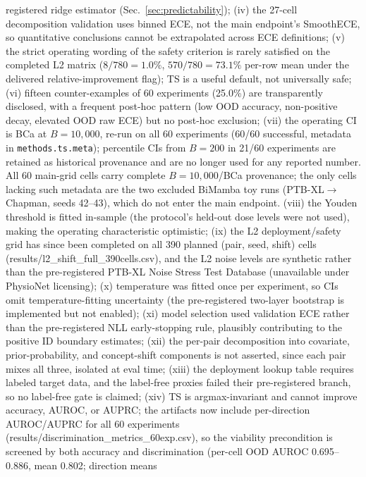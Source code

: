 \documentclass[final,5p,times,nonatbib]{elsarticle}
\begin{document}
registered ridge estimator
(Sec.~\ref{sec:predictability}); (iv) the 27-cell decomposition validation uses binned ECE,
not the main endpoint's SmoothECE, so quantitative conclusions cannot be
extrapolated across ECE definitions; (v) the strict operating wording of
the safety criterion is rarely satisfied on the completed L2 matrix
($8/780 = 1.0\%$, $570/780 = 73.1\%$ per-row mean under the delivered
relative-improvement flag); TS is a
useful default, not universally safe; (vi) fifteen counter-examples of 60
experiments (25.0\%) are transparently disclosed, with a frequent post-hoc pattern
(low OOD accuracy, non-positive decay, elevated OOD raw ECE) but no
post-hoc exclusion; (vii) the operating CI is BCa at $B=10{,}000$,
re-run on all 60 experiments (60/60 successful, metadata in
\texttt{methods.ts.meta}); percentile CIs from $B=200$ in 21/60
experiments are retained as historical provenance and are no longer
used for any reported number. All 60 main-grid cells carry complete
$B=10{,}000$/BCa provenance; the only cells lacking such metadata are
the two excluded BiMamba toy runs
(PTB-XL$\rightarrow$Chapman, seeds 42--43), which do not enter the
main endpoint. (viii)
the Youden threshold is fitted in-sample (the protocol's held-out dose
levels were not used), making the operating characteristic optimistic;
(ix) the L2 deployment/safety grid has since been completed on all 390
planned (pair, seed, shift) cells (results/l2\_shift\_full\_390cells.csv),
and the L2 noise
levels are synthetic rather than the pre-registered PTB-XL Noise Stress
Test Database (unavailable under PhysioNet licensing); (x) temperature
was fitted once per experiment, so CIs omit temperature-fitting
uncertainty (the pre-registered two-layer bootstrap is implemented but
not enabled); (xi) model selection used validation ECE rather than the pre-registered
NLL early-stopping rule, plausibly contributing to the positive ID
boundary estimates; (xii) the per-pair decomposition into covariate,
prior-probability, and concept-shift components is not asserted, since
each pair mixes all three, isolated at eval time; (xiii) the deployment
lookup table requires labeled target data, and the label-free proxies
failed their pre-registered branch, so no label-free gate is claimed;
(xiv) TS is argmax-invariant and cannot improve accuracy, AUROC, or
AUPRC; the artifacts now include per-direction AUROC/AUPRC for all 60
experiments (results/discrimination\_metrics\_60exp.csv), so the
viability precondition is screened by both accuracy and discrimination
(per-cell OOD AUROC 0.695--0.886, mean 0.802; direction means
\end{document}
